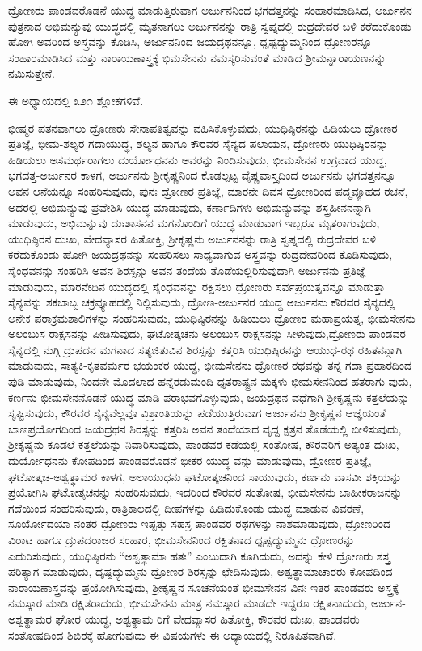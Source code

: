 ದ್ರೋಣರು ಪಾಂಡವರೊಡನೆ ಯುದ್ಧ ಮಾಡುತ್ತಿರುವಾಗ ಅರ್ಜುನನಿಂದ ಭಗದತ್ತನನ್ನು ಸಂಹಾರಮಾಡಿಸಿದ, ಅರ್ಜುನನ ಪುತ್ರನಾದ ಅಭಿಮನ್ಯುವು ಯುದ್ಧದಲ್ಲಿ ಮೃತನಾಗಲು ಅರ್ಜುನನನ್ನು ರಾತ್ರಿ ಸ್ವಪ್ನದಲ್ಲಿ ರುದ್ರದೇವರ ಬಳಿ ಕರೆದುಕೊಂಡು ಹೋಗಿ ಅವರಿಂದ ಅಸ್ತ್ರವನ್ನು ಕೊಡಿಸಿ, ಅರ್ಜುನನಿಂದ ಜಯದ್ರಥನನ್ನೂ, ಧೃಷ್ಟದ್ಯುಮ್ಮನಿಂದ ದ್ರೋಣರನ್ನೂ ಸಂಹಾರಮಾಡಿಸಿದ ಮತ್ತು ನಾರಾಯಣಾಸ್ತ್ರಕ್ಕೆ ಭಿಮಸೇನನು ನಮಸ್ಕರಿಸುವಂತೆ ಮಾಡಿದ ಶ‍್ರೀಮನ್ನಾರಾಯಣನನ್ನು ನಮಿಸುತ್ತೇನೆ.

ಈ ಅಧ್ಯಾಯದಲ್ಲಿ ೩೨೧ ಶ್ಲೋಕಗಳಿವೆ.

ಭೀಷ್ಮರ ಪತನವಾಗಲು ದ್ರೋಣರು ಸೇನಾಪತಿತ್ವವನ್ನು ವಹಿಸಿಕೊಳ್ಳುವುದು, ಯುಧಿಷ್ಠಿರನನ್ನು ಹಿಡಿಯಲು ದ್ರೋಣರ ಪ್ರತಿಜ್ಞೆ, ಭೀಮ-ಶಲ್ಯರ ಗದಾಯುದ್ಧ, ಶಲ್ಯನ ಹಾಗೂ ಕೌರವರ ಸೈನ್ಯದ ಪಲಾಯನ, ದ್ರೋಣರು ಯುಧಿಷ್ಠಿರನನ್ನು ಹಿಡಿಯಲು ಅಸಮರ್ಥರಾಗಲು ದುರ್ಯೋಧನನು ಅವರನ್ನು ನಿಂದಿಸುವುದು, ಭೀಮಸೇನನ ಉಗ್ರವಾದ ಯುದ್ಧ, ಭಗದತ್ತ-ಅರ್ಜುನರ ಕಾಳಗ, ಅರ್ಜುನನು ಶ‍್ರೀಕೃಷ್ಣನಿಂದ ಕೊಡಲ್ಪಟ್ಟ ವೈಷ್ಣವಾಸ್ತ್ರದಿಂದ ಅರ್ಜುನನು ಭಗದತ್ತನನ್ನೂ ಅವನ ಆನೆಯನ್ನೂ ಸಂಹರಿಸುವುದು, ಪುನಃ ದ್ರೋಣರ ಪ್ರತಿಜ್ಞೆ, ಮಾರನೇ ದಿವಸ ದ್ರೋಣರಿಂದ ಪದ್ಮವ್ಯೂಹದ ರಚನೆ, ಅದರಲ್ಲಿ ಅಭಿಮನ್ಯುವು ಪ್ರವೇಶಿಸಿ ಯುದ್ಧ ಮಾಡುವುದು, ಕರ್ಣಾದಿಗಳು ಅಭಿಮನ್ಯುವನ್ನು ಶಸ್ತ್ರಹೀನನನ್ನಾಗಿ ಮಾಡುವುದು, ಅಭಿಮನ್ನುವು ದುಃಶಾಸನನ ಮಗನೊಂದಿಗೆ ಯುದ್ಧ ಮಾಡುವಾಗ ಇಬ್ಬರೂ ಮೃತರಾಗುವುದು, ಯುಧಿಷ್ಠಿರನ ದುಃಖ, ವೇದವ್ಯಾಸರ ಹಿತೋಕ್ತಿ, ಶ‍್ರೀಕೃಷ್ಣನು ಅರ್ಜುನನನ್ನು ರಾತ್ರಿ ಸ್ವಪ್ನದಲ್ಲಿ ರುದ್ರದೇವರ ಬಳಿ ಕರೆದುಕೊಂಡು ಹೋಗಿ ಜಯದ್ರಥನನ್ನು ಸಂಹರಿಸಲು ಸಾಧ್ಯವಾಗುವ ಅಸ್ತ್ರವನ್ನು ರುದ್ರದೇವರಿಂದ ಕೊಡಿಸುವುದು, ಸೈಂಧವನನ್ನು ಸಂಹರಿಸಿ ಅವನ ಶಿರಸ್ಸನ್ನು ಅವನ ತಂದೆಯ ತೊಡೆಯಲ್ಲಿರಿಸುವುದಾಗಿ ಅರ್ಜುನನು ಪ್ರತಿಜ್ಞೆ ಮಾಡುವುದು, ಮಾರನೇದಿನ ಯುದ್ಧದಲ್ಲಿ ಸೈಂಧವನನ್ನು ರಕ್ಷಿಸಲು ದ್ರೋಣರು ಸರ್ವಪ್ರಯತ್ನವನ್ನೂ ಮಾಡುತ್ತಾ ಸೈನ್ಯವನ್ನು ಶಕಬಾಬ್ಬ ಚಕ್ರವ್ಯೂಹದಲ್ಲಿ ನಿಲ್ಲಿಸುವುದು, ದ್ರೋಣ-ಅರ್ಜುನರ ಯುದ್ಧ ಅರ್ಜುನನು ಕೌರವರ ಸೈನ್ಯದಲ್ಲಿ ಅನೇಕ ಪರಾಕ್ರಮಶಾಲಿಗಳನ್ನು ಸಂಹರಿಸುವುದು, ಯುಧಿಷ್ಠಿರನನ್ನು ಹಿಡಿಯಲು ದ್ರೋಣರ ಮಹಾಪ್ರಯತ್ನ, ಭೀಮಸೇನನು ಅಲಂಬುಸ ರಾಕ್ಷಸನನ್ನು ಪೀಡಿಸುವುದು, ಘಟೋತ್ಕಚನು ಅಲಂಬುಸ ರಾಕ್ಷಸನನ್ನು ಸೀಳುವುದು,\break ದ್ರೋಣರು ಪಾಂಡವರ ಸೈನ್ಯದಲ್ಲಿ ನುಗ್ಗಿ ದ್ರುಪದನ ಮಗನಾದ ಸತ್ಯಜಿತುವಿನ ಶಿರಸ್ಸನ್ನು ಕತ್ತರಿಸಿ ಯುಧಿಷ್ಠಿರನನ್ನು ಆಯುಧ-ರಥ ರಹಿತನನ್ನಾಗಿ ಮಾಡುವುದು, ಸಾತ್ಯಕಿ-ಕೃತವರ್ಮರ ಭಯಂಕರ ಯುದ್ಧ, ಭೀಮಸೇನನು ದ್ರೋಣರ ರಥವನ್ನು ತನ್ನ ಗದಾ ಪ್ರಹಾರದಿಂದ ಪುಡಿ ಮಾಡುವುದು, ನಿಂದನೇ ಮೊದಲಾದ ಹನ್ನೆರಡುಮಂದಿ ಧೃತರಾಷ್ಟ್ರನ ಮಕ್ಕಳು ಭೀಮಸೇನನಿಂದ ಹತರಾಗು ವುದು, ಕರ್ಣನು ಭೀಮಸೇನನೊಡನೆ ಯುದ್ಧ ಮಾಡಿ ಪರಾಭವಗೊಳ್ಳುವುದು, ಜಯದ್ರಥನ ವಧೆಗಾಗಿ ಶ‍್ರೀಕೃಷ್ಣನು ಕತ್ತಲೆಯನ್ನು ಸೃಷ್ಟಿಸುವುದು, ಕೌರವರ ಸೈನ್ಯವೆಲ್ಲವೂ ವಿಶ್ರಾಂತಿಯನ್ನು ಪಡೆಯುತ್ತಿರುವಾಗ ಅರ್ಜುನನು ಶ‍್ರೀಕೃಷ್ಣನ ಆಜ್ಞೆಯಂತೆ ಬಾಣಪ್ರಯೋಗದಿಂದ ಜಯದ್ರಥನ ಶಿರಸ್ಸನ್ನು ಕತ್ತರಿಸಿ ಅವನ ತಂದೆಯಾದ ವೃದ್ದ ಕ್ಷತ್ರನ ತೊಡೆಯಲ್ಲಿ ಬೀಳಿಸುವುದು, ಶ‍್ರೀಕೃಷ್ಣನು ಕೂಡಲೆ ಕತ್ತಲೆಯನ್ನು ನಿವಾರಿಸುವುದು, ಪಾಂಡವರ ಕಡೆಯಲ್ಲಿ ಸಂತೋಷ, ಕೌರವರಿಗೆ ಅತ್ಯಂತ ದುಃಖ, ದುರ್ಯೋಧನನು ಕೋಪದಿಂದ ಪಾಂಡವರೊಡನೆ ಭೀಕರ ಯುದ್ಧ ವನ್ನು ಮಾಡುವುದು, ದ್ರೋಣರ ಪ್ರತಿಜ್ಞೆ, ಘಟೋತ್ಕಚ-ಅಶ್ವತ್ಥಾಮರ ಕಾಳಗ, ಅಲಾಯುಧನು ಘಟೋತ್ಕಚನಿಂದ ಸಾಯುವುದು, ಕರ್ಣನು ವಾಸವೀ ಶಕ್ತಿಯನ್ನು ಪ್ರಯೋಗಿಸಿ ಘಟೋತ್ಕಚನನ್ನು ಸಂಹರಿಸುವುದು, ಇದರಿಂದ ಕೌರವರ ಸಂತೋಷ, ಭೀಮಸೇನನು ಬಾಹೀಕರಾಜನನ್ನು ಗದೆಯಿಂದ ಸಂಹರಿಸುವುದು, ರಾತ್ರಿಕಾಲದಲ್ಲಿ ದೀಪಗಳನ್ನು ಹಿಡಿದುಕೊಂಡು ಯುದ್ಧ ಮಾಡುವ ವಿವರಣೆ, ಸೂರ್ಯೋದಯಾ ನಂತರ ದ್ರೋಣರು ಇಪ್ಪತ್ತು ಸಹಸ್ರ ಪಾಂಡವರ ರಥಗಳನ್ನು ನಾಶಮಾಡುವುದು, ದ್ರೋಣರಿಂದ ವಿರಾಟ ಹಾಗೂ ದ್ರುಪದರಾಜರ ಸಂಹಾರ, ಭೀಮಸೇನನಿಂದ ರಕ್ಷಿತನಾದ ಧೃಷ್ಟದ್ಯುಮ್ಮನು ದ್ರೋಣರನ್ನು ಎದುರಿಸುವುದು, ಯುಧಿಷ್ಠಿರನು “ಅಶ್ವತ್ಥಾಮಾ ಹತಃ” ಎಂಬುದಾಗಿ ಕೂಗಿದುದು, ಅದನ್ನು ಕೇಳಿ ದ್ರೋಣರು ಶಸ್ತ್ರ ಪರಿತ್ಯಾಗ ಮಾಡುವುದು, ಧೃಷ್ಟದ್ಯುಮ್ಮನು ದ್ರೋಣರ ಶಿರಸ್ಸನ್ನು ಛೇದಿಸುವುದು, ಅಶ್ವತ್ಥಾಮಾಚಾರರು ಕೋಪದಿಂದ ನಾರಾಯಣಾಸ್ತ್ರವನ್ನು ಪ್ರಯೋಗಿಸುವುದು, ಶ‍್ರೀಕೃಷ್ಣನ ಸೂಚನೆಯಂತೆ ಭೀಮಸೇನನ ವಿನಃ ಇತರ ಪಾಂಡವರು ಅಸ್ತ್ರಕ್ಕೆ ನಮಸ್ಕಾರ ಮಾಡಿ ರಕ್ಷಿತರಾದುದು, ಭೀಮಸೇನನು ಮಾತ್ರ ನಮಸ್ಕಾರ ಮಾಡದೇ ಇದ್ದರೂ ರಕ್ಷಿತನಾದುದು, ಅರ್ಜುನ-ಅಶ್ವತ್ಥಾಮರ ಘೋರ ಯುದ್ಧ, ಅಶ್ವತ್ಥಾಮ ರಿಗೆ ವೇದವ್ಯಾಸರ ಹಿತೋಕ್ತಿ, ಕೌರವರ ದುಃಖ, ಪಾಂಡವರು ಸಂತೋಷದಿಂದ ಶಿಬಿರಕ್ಕೆ ಹೋಗುವುದು ಈ ವಿಷಯಗಳು ಈ ಅಧ್ಯಾಯದಲ್ಲಿ ನಿರೂಪಿತವಾಗಿವೆ.


